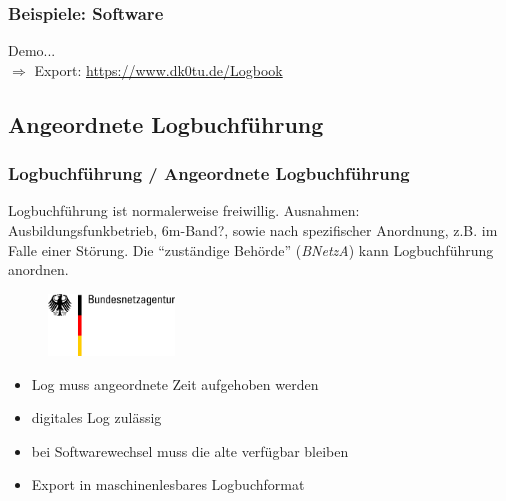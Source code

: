 \begin{frame}
  \frametitle{Beispiele: Software}

  \begin{center}

    \Large Demo... \\[3em]

    \normalsize $\Rightarrow$ Export: \ExternalLink\url{https://www.dk0tu.de/Logbook}

  \end{center}

\end{frame}

\subsection{Angeordnete Logbuchführung}

\begin{frame}
  \frametitle{Logbuchführung / Angeordnete Logbuchführung}

  Logbuchführung ist normalerweise freiwillig.
  Ausnahmen: Ausbildungsfunkbetrieb, 6m-Band?, sowie nach
  spezifischer Anordnung, z.B. im Falle einer Störung.
  Die ``zuständige Behörde'' (\emph{BNetzA}) kann Logbuchführung anordnen.

  \begin{center}
    \begin{figure}
      \includegraphics[width=0.3\textwidth,height=.3\textheight,keepaspectratio]{bv13/Bundesnetzagentur_logo_709px.png}
    \end{figure}
  \end{center}

  \begin{itemize}
    \item Log muss angeordnete Zeit aufgehoben werden
    \item digitales Log zulässig
    \item bei Softwarewechsel muss die alte verfügbar bleiben
    \item Export in maschinenlesbares Logbuchformat
  \end{itemize}

\end{frame}

